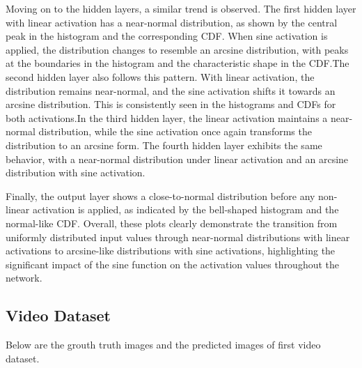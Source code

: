 \documentclass{ioereport}
\begin{document}
    Moving on to the hidden layers, a similar trend is observed. The first hidden layer with linear activation has a near-normal distribution, as shown by the central peak in the histogram and the corresponding CDF. When sine activation is applied, the distribution changes to resemble an arcsine distribution, with peaks at the boundaries in the histogram and the characteristic shape in the CDF.The second hidden layer also follows this pattern. With linear activation, the distribution remains near-normal, and the sine activation shifts it towards an arcsine distribution. This is consistently seen in the histograms and CDFs for both activations.In the third hidden layer, the linear activation maintains a near-normal distribution, while the sine activation once again transforms the distribution to an arcsine form. The fourth hidden layer exhibits the same behavior, with a near-normal distribution under linear activation and an arcsine distribution with sine activation.

    Finally, the output layer shows a close-to-normal distribution before any non-linear activation is applied, as indicated by the bell-shaped histogram and the normal-like CDF. Overall, these plots clearly demonstrate the transition from uniformly distributed input values through near-normal distributions with linear activations to arcsine-like distributions with sine activations, highlighting the significant impact of the sine function on the activation values throughout the network.


    \subsection{Video Dataset}
    Below are the grouth truth images and the predicted images of first video dataset.
\end{document}
